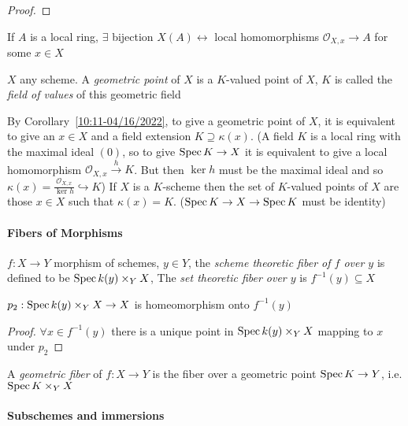 \documentclass[main]{subfiles}
\begin{document}
\begin{proof}

\end{proof}

\begin{corollary}\label{10:11-04/16/2022}
If $A$ is a local ring, $\exists$ bijection $X(A)\leftrightarrow$ local homomorphisms $\mathcal O_{X,x}\to A$ for some $x\in X$
\end{corollary}

\begin{definition}
$X$ any scheme. A \textit{geometric point} of $X$ is a $K$-valued point of $X$, $K$ is called the \textit{field of values} of this geometric field
\end{definition}

\clubsuit\quad By Corollary~\ref{10:11-04/16/2022}, to give a geometric point of $X$, it is equivalent to give an $x\in X$ and a field extension $K\supseteq\kappa(x)$. (A field $K$ is a local ring with the maximal ideal $(0)$, so to give $\operatorname{Spec} K\to X$ it is equivalent to give a local homomorphism $\mathcal O_{X,x}\xrightarrow{h}K$. But then $\ker h$ must be the maximal ideal and so $\kappa(x)=\frac{\mathcal O_{X,x}}{\ker h}\hookrightarrow K$)
\clubsuit\quad If $X$ is a $K$-scheme then the set of $K$-valued points of $X$ are those $x\in X$ such that $\kappa(x)=K$. ($\operatorname{Spec} K\to X\to\operatorname{Spec} K$ must be identity)

\paragraph{Fibers of Morphisms} $f:X\to Y$ morphism of schemes, $y\in Y$, the \textit{scheme theoretic fiber of $f$ over $y$} is defined to be $\operatorname{Spec} k(y)\times_YX$, The \textit{set theoretic fiber over $y$} is $f^{-1}(y)\subseteq X$

\clubsuit\quad $p_2:\operatorname{Spec} k(y)\times_YX\to X$ is homeomorphism onto $f^{-1}(y)$

\begin{proof}
$\forall x\in f^{-1}(y)$ there is a unique point in $\operatorname{Spec} k(y)\times_YX$ mapping to $x$ under $p_2$
\end{proof}

\clubsuit\quad A \textit{geometric fiber} of $f:X\to Y$ is the fiber over a geometric point $\operatorname{Spec} K\to Y$, i.e. $\operatorname{Spec} K\times_YX$

\paragraph{Subschemes and immersions}
\end{document}
